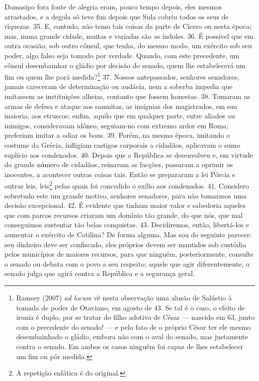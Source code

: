 Damasipo fora fonte de alegria eram, pouco tempo depois, eles mesmos
arrastados, e a degola só teve fim depois que Sula cobriu todos os seus de
riquezas. 35. E, contudo, não temo tais coisas da parte de  Cícero ou nesta
época; mas, numa grande cidade, muitas e variadas são as índoles. 36. É
possível que em outra ocasião, sob outro cônsul, que tenha, do mesmo modo, um
exército sob seu poder, algo falso seja tomado por verdade. Quando, com
este precedente, um cônsul desembainhar o gládio por decisão do senado, quem
lhe estabelecerá um fim ou quem lhe porá medida?\footnote{Ramsey (2007)
\emph{ad locum} vê nesta observação uma alusão de Salústio à tomada de poder de
Otaviano, em agosto de 43. Se tal é o caso, o efeito de ironia é duplo, por se
tratar do filho adotivo de César --- nascido em 63, junto com o precedente do
senado! --- e pelo fato de o próprio César ter ele mesmo desembainhado o
gládio, embora não com o aval do senado, mas justamente contra o senado. Em
ambos os casos ninguém foi capaz de lhes estabelecer um fim ou pôr medida.} 37.
Nossos antepassados, senhores senadores, jamais careceram de determinação ou
audácia, nem a soberba impedia que imitassem as instituições alheias, contanto
que fossem honestas. 38. Tomaram as armas de defesa e ataque aos samnitas, as
insígnias dos magistrados, em sua maioria, aos etruscos; enfim, aquilo que em
qualquer parte, entre aliados ou inimigos, consideravam idôneo, seguiam-no com
extremo ardor em Roma; preferiam imitar a odiar os bons. 39. Porém, na mesma
época, imitando o costume da Grécia, infligiam castigos corporais a cidadãos,
aplicavam o sumo suplício aos condenados. 40. Depois que a República se
desenvolveu e, em virtude do grande número de cidadãos, reinavam as facções,
passaram a oprimir os inocentes, a acontecer outras coisas tais. Então se
prepararam a lei Pórcia e outras leis, leis\footnote{A repetição enfática é do original.}
pelas quais foi concedido o exílio aos condenados. 41. Considero sobretudo este
um grande motivo, senhores senadores, para não tomarmos uma decisão
excepcional. 42. É evidente que tinham maior valor e sabedoria aqueles que com
parcos recursos criaram um domínio tão grande, do que nós, que mal conseguimos
sustentar tão belas conquistas. 43. Decidiremos, então, libertá-los e aumentar
o exército de Catilina? De forma alguma. Mas sou do seguinte parecer: seu
dinheiro deve ser confiscado, eles próprios devem ser mantidos sob custódia
pelos municípios de maiores recursos, para que ninguém, posteriormente,
consulte o senado ou debata com o povo a seu respeito; aquele que agir
diferentemente, o senado julga que agirá contra a República e a segurança
geral.

